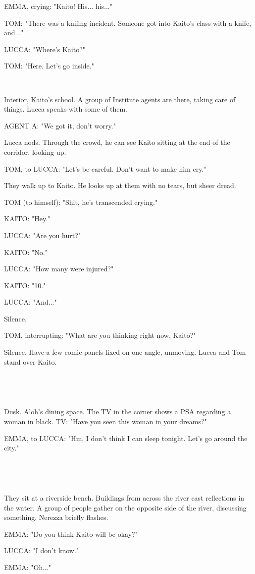 \documentclass[11pt]{article}
\begin{document}
EMMA, crying: "Kaito! His... his..." 

TOM: "There was a knifing incident.
Someone got into Kaito's class with a knife, and..."

LUCCA: "Where's Kaito?"

TOM: "Here. Let's go inside."

\ 

Interior, Kaito's school.
A group of Institute agents are there, taking care of things. 
Lucca speaks with some of them. 

AGENT A: "We got it, don't worry."

Lucca nods.
Through the crowd, he can see Kaito sitting at the end of the corridor, looking up.

TOM, to LUCCA: "Let's be careful.
Don't want to make him cry."

They walk up to Kaito.
He looks up at them with no tears, but sheer dread.

TOM (to himself): "Shit, he's transcended crying."

KAITO: "Hey."

LUCCA: "Are you hurt?"

KAITO: "No."

LUCCA: "How many were injured?"

KAITO: "10."

LUCCA: "And..."

Silence.

TOM, interrupting: "What are you thinking right now, Kaito?"

Silence.
Have a few comic panels fixed on one angle, unmoving.
Lucca and Tom stand over Kaito.

\ 

\ 

Dusk.
Aloh's dining space.
The TV in the corner shows a PSA regarding a woman in black.
TV: "Have you seen this woman in your dreams?"

EMMA, to LUCCA: "Hm, I don't think I can sleep tonight.
Let's go around the city."

\ 

\ 

They sit at a riverside bench.
Buildings from across the river cast reflections in the water.
A group of people gather on the opposite side of the river, discussing something.
Nerezza briefly flashes.

EMMA: "Do you think Kaito will be okay?"

LUCCA: "I don't know."

EMMA: "Oh..."
\end{document}
